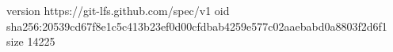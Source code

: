 version https://git-lfs.github.com/spec/v1
oid sha256:20539cd67f8e1c5c413b23ef0d00cfdbab4259e577c02aaebabd0a8803f2d6f1
size 14225

